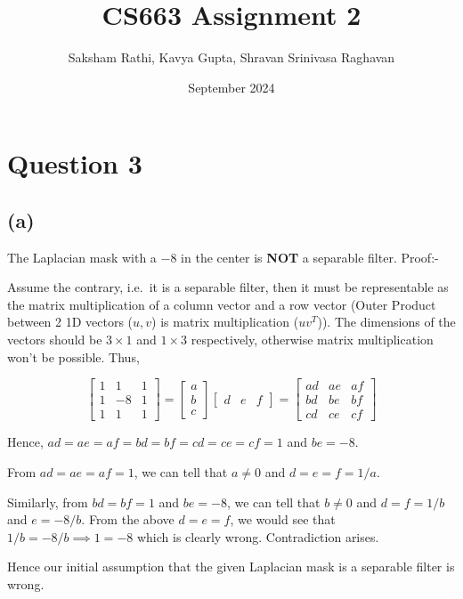 \documentclass[12pt]{article}
\title{{\bf CS663 Assignment 2}}
\author{Saksham Rathi, Kavya Gupta, Shravan Srinivasa Raghavan}
\date{September 2024}
\begin{document}
\maketitle
\clearpage
\tableofcontents
\clearpage
\section*{Question 3}

\subsection*{(a)}
The Laplacian mask with a $-8$ in the center is \textbf{NOT} a separable filter. Proof:-

Assume the contrary, i.e.\ it is a separable filter, then it must be representable as the matrix multiplication of a column vector and a row vector (Outer Product between 2 1D vectors ($u, v$) is matrix multiplication ($uv^T$)). The dimensions of the vectors should be $3 \times 1$ and $1 \times 3$ respectively, otherwise matrix multiplication won't be possible. Thus,

\[
\begin{bmatrix}
1 & 1 & 1 \\
1 & -8 & 1 \\
1 & 1 & 1
\end{bmatrix}
=
\begin{bmatrix}
a \\
b \\
c
\end{bmatrix}
\begin{bmatrix}
    d & e & f
\end{bmatrix}
=
\begin{bmatrix}
ad & ae & af \\
bd & be & bf \\
cd & ce & cf
\end{bmatrix}
\]

Hence, $ad = ae = af = bd = bf = cd = ce = cf = 1$ and $be = -8$.

From $ad = ae = af = 1$, we can tell that $a \neq 0$ and $d = e = f = 1/a$.

Similarly, from $bd = bf = 1$ and $be = -8$, we can tell that $b \neq 0$ and $d = f = 1/b$ and $e = -8/b$. From the above $d = e = f$, we would see that $1/b = -8/b \implies 1 = -8$ which is clearly wrong. Contradiction arises.

Hence our initial assumption that the given Laplacian mask is a separable filter is wrong.
\end{document}

